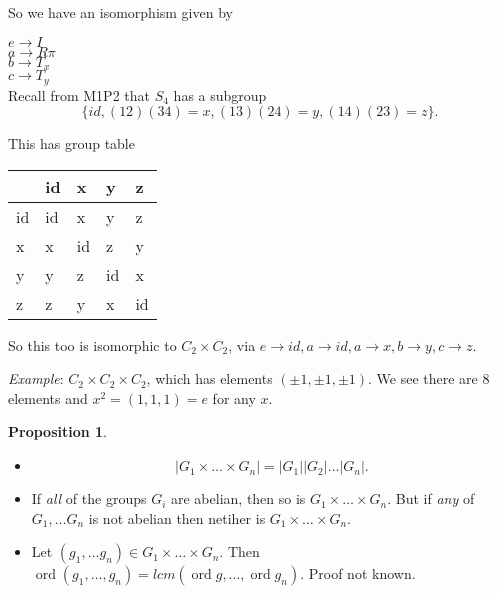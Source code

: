 \documentclass{article}
\theoremstyle{definition}
\newtheorem{proposition}{Proposition}
\DeclareMathOperator{\ord}{\text{ord}}
\begin{document}
So we have an isomorphism given by

$e \rightarrow I$\\
$a \rightarrow R\pi$\\
$b \rightarrow T_x$\\
$c \rightarrow T_y$\\

Recall from M1P2 that $S_4$ has a subgroup $$\{id,  (12)(34)=x, (13)(24)=y, (14)(23)=z\}.$$

This has group table 
\begin{table}[]
\centering
\begin{tabular}{l|llll}
   & id & x  & y  & z \\
   \hline
id & id & x  & y  & z \\
x  & x  & id & z  & y \\
y  & y  & z  & id & x \\
z  & z  & y  & x  & id 
\end{tabular}
\end{table}

So this too is isomorphic to $C_2 \times C_2$, via $e \rightarrow id, a \rightarrow id, a \rightarrow x, b \rightarrow y, c \rightarrow z$.

\emph{Example}: $C_2 \times C_2 \times C_2$, which has elements $(\pm 1, \pm 1, \pm 1)$. We see there are 8 elements and $x^2=(1,1,1)=e$ for any $x$.

\begin{proposition}
\begin{itemize}
\item $$|G_1 \times \ldots \times G_n| =|G_1||G_2|\ldots|G_n|.$$
\item If \emph{all} of the groups $G_i$ are abelian, then so is $G_1 \times \ldots \times G_n$. But if \emph{any} of $G_1, \ldots G_n$ is not abelian then netiher is $G_1 \times \ldots \times G_n$.
\item Let $(g_1, \ldots g_n) \in G_1 \times \ldots \times G_n$. Then $\ord (g_1, \ldots , g_n) = lcm (\ord g, \ldots , \ord g_n)$.
Proof not known.
\end{itemize}
\end{proposition}
\end{document}

